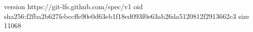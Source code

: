version https://git-lfs.github.com/spec/v1
oid sha256:f2fba2b627febccffe90e0d63eb1f18ed093f0e63ab26da5120812f2913662c3
size 11068
